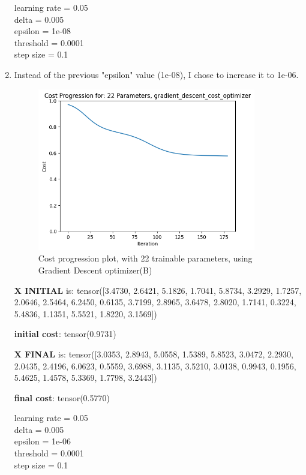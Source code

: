 \documentclass[inscr,ack,preface]{diphdthesis}
\begin{document}
\begin{enumerate}[label=\textbf{\Alph*.}]
    learning rate =  0.05 \\
    delta =  0.005 \\
    epsilon =  1e-08 \\
    threshold =  0.0001\\
    step size =  0.1 \\
    
    \item \textbf{ }

    Instead of the previous "epsilon" value (1e-08), I chose to increase it to 1e-06.

    \begin{figure}[H]
        \centering
        \includegraphics[width=0.9\textwidth]{epsilon06/22.png}
        \caption{Cost progression plot, with 22 trainable parameters, using Gradient Descent optimizer(B)} 
        \label{fig:fig2}
    \end{figure}

    \textbf{X INITIAL} is:
    tensor([3.4730, 2.6421, 5.1826, 1.7041, 5.8734, 3.2929, 1.7257, 2.0646, 2.5464,
           6.2450, 0.6135, 3.7199, 2.8965, 3.6478, 2.8020, 1.7141, 0.3224, 5.4836,
           1.1351, 5.5521, 1.8220, 3.1569])
           
    \textbf{initial cost}: tensor(0.9731)

    \textbf{X FINAL} is:
    tensor([3.0353, 2.8943, 5.0558, 1.5389, 5.8523, 3.0472, 2.2930, 2.0435, 2.4196,
           6.0623, 0.5559, 3.6988, 3.1135, 3.5210, 3.0138, 0.9943, 0.1956, 5.4625,
           1.4578, 5.3369, 1.7798, 3.2443])

    \textbf{final cost}: tensor(0.5770)

    learning rate =  0.05 \\
    delta =  0.005 \\
    epsilon =  1e-06 \\
    threshold =  0.0001\\ 
    step size =  0.1 \\

\end{enumerate}
\end{document}
